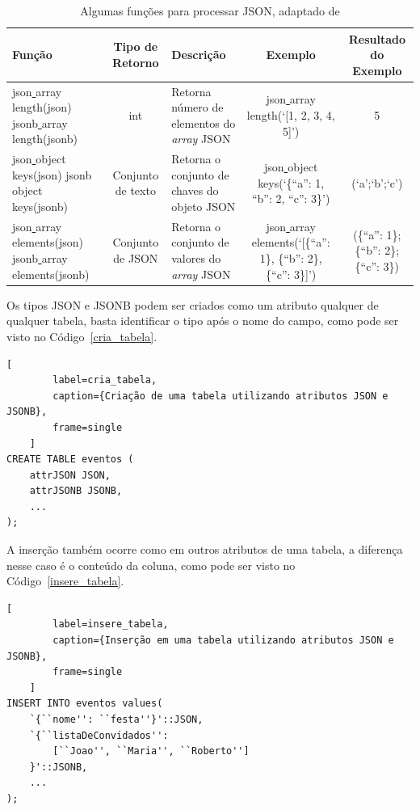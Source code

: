 \documentclass[article,11pt,oneside,a4paper]{abntex2} %
\begin{document}
	\begin{table}[!h]
		\centering
		\caption{Algumas funções para processar JSON, adaptado de \cite{postgresql}}
		\label{func_tb}
		\begin{adjustbox}{max width=\textwidth}
			\begin{tabular}{|p{5cm}|c|p{5cm}|c|c|}
				\hline
				Função & Tipo de Retorno & Descrição & Exemplo & Resultado do Exemplo 
				\\ \hline
				json\underline{ }array\underline{ }length(json)
				jsonb\underline{ }array\underline{ }length(jsonb) & int & Retorna número de elementos do \textit{array} JSON & json\underline{ }array\underline{ }length(`[1, 2, 3, 4, 5]') & 5
				\\ \hline
				json\underline{ }object\underline{ }keys(json)
				jsonb\underline{ }object\underline{ }keys(jsonb) & Conjunto de texto & Retorna o conjunto de chaves do objeto JSON &json\underline{ }object\underline{ }keys(`\{``a'': 1, ``b'': 2, ``c'': 3\}') & (`a';`b';`c')
				\\ \hline
				json\underline{ }array\underline{ }elements(json)
				jsonb\underline{ }array\underline{ }elements(jsonb) & Conjunto de JSON & Retorna o conjunto de valores do \textit{array} JSON &json\underline{ }array\underline{ }elements(`[\{``a'': 1\}, \{``b'': 2\}, \{``c'': 3\}]') & (\{``a'': 1\}; \{``b'': 2\}; \{``c'': 3\})
				\\ \hline
				
			\end{tabular}
		\end{adjustbox}
	\end{table}
	\newpage
	Os tipos JSON e JSONB podem ser criados como um atributo qualquer de qualquer tabela, basta identificar o tipo após o nome do campo, como pode ser visto no Código~\ref{cria_tabela}.

	\begin{lstlisting}[
		label=cria_tabela,
		caption={Criação de uma tabela utilizando atributos JSON e JSONB},
		frame=single
	]
CREATE TABLE eventos ( 
	attrJSON JSON,
	attrJSONB JSONB,
	...
); 
	\end{lstlisting}
	
	A inserção também ocorre como em outros atributos de uma tabela, a diferença nesse caso é o conteúdo da coluna, como pode ser visto no Código~\ref{insere_tabela}.
	
	\begin{lstlisting}[
		label=insere_tabela,
		caption={Inserção em uma tabela utilizando atributos JSON e JSONB},
		frame=single
	]
INSERT INTO eventos values(
	`{``nome'': ``festa''}'::JSON,
	`{``listaDeConvidados'': 
		[``Joao'', ``Maria'', ``Roberto'']
	}'::JSONB,
	...
);
	\end{lstlisting}
	
\end{document}
